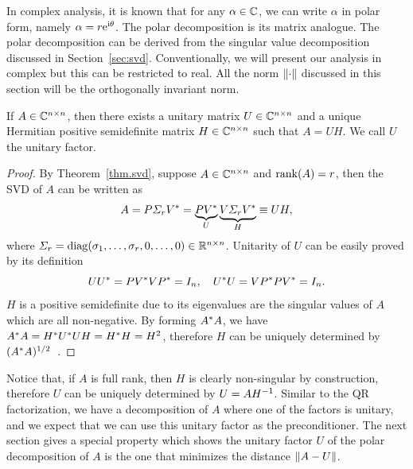In complex analysis, it is known that for any $\alpha\in\mathbb{C}$, we can write $\alpha$ in polar form, namely $\alpha = r\mathrm{e}^{\mathrm{i} \theta}$. The polar decomposition is its matrix analogue. The polar decomposition can be derived from the singular value decomposition discussed in Section~\ref{sec:svd}. Conventionally, we will present our analysis in complex but this can be restricted to real. All the norm $\|{\cdot}\|$ discussed in this section will be the orthogonally invariant norm.


\begin{theorem}
    \label{thm.polar-decompo}
    If $A\in\mathbb{C}^{n\times n}$, then there exists a unitary matrix $U\in\mathbb{C}^{n\times n}$ and a unique Hermitian positive semidefinite matrix $H\in\mathbb{C}^{n\times n}$ such that $A = UH$. We call $U$ the unitary factor.
\end{theorem}

\begin{proof}
    By Theorem~\ref{thm.svd}, suppose $A\in\mathbb{C}^{n\times n}$ and $\mathrm{rank}(A) = r$, then the SVD of $A$ can be written as 
    \begin{equation}\label{eq.polar-decomp-factors}
        A = P\varSigma_r V^* = 
        \underbrace{PV^*}_{U} 
        \underbrace{
        V \varSigma_r
        V^*}_{H}
        \equiv UH,
    \end{equation}
    where $\varSigma_r = \mathrm{diag}(\sigma_1,\dots,\sigma_r,0,\dots,0)\in\mathbb{R}^{n\times n}$.
    Unitarity of $U$ can be easily proved by its definition 
    \begin{equation}\notag
        UU^* = PV^* VP^* = I_n,\quad U^* U = VP^* P V^* = I_n.
    \end{equation}
    $H$ is a positive semidefinite due to its eigenvalues are the singular values of $A$ which are all non-negative. By forming $A^* A$, we have $A^* A = H^* U^* U H = H^* H = H^2$, therefore $H$ can be uniquely determined by $(A^* A)^{1/2}$~.
\end{proof}

Notice that, if $A$ is full rank, then $H$ is clearly non-singular by construction, therefore $U$ can be uniquely determined by $U = AH^{-1}$. Similar to the QR factorization, we have a decomposition of $A$ where one of the factors is unitary, and we expect that we can use this unitary factor as the preconditioner. The next section gives a special property which shows the unitary factor $U$ of the polar decomposition of $A$ is the one that minimizes the distance $\|{A-U}\|$.

